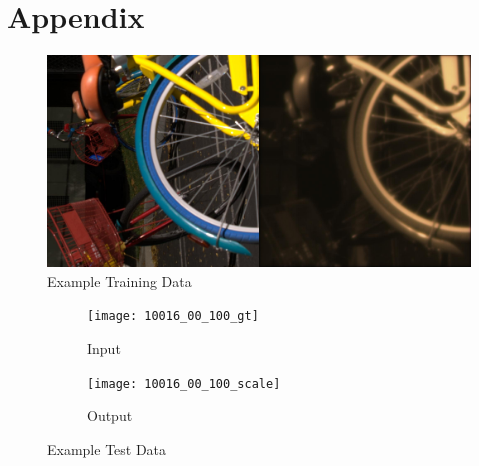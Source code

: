 \documentclass{article}
\begin{document}
\section{Appendix}

\begin{figure}[ht]
  \centering
  \includegraphics[scale=0.1]{00002_00_train_100}
  \caption{ Example Training Data}
  \label{fig:train}
\end{figure}

\begin{figure}[ht]
  \centering
  \begin{subfigure}[t]{0.3\textwidth}
    \texttt{[image: 10016\_00\_100\_gt]}
    \caption{Input}
  \end{subfigure}
  \begin{subfigure}[t]{0.3\textwidth}
    \texttt{[image: 10016\_00\_100\_scale]}
    \caption{Output}
  \end{subfigure}
  \caption{ Example Test Data}
  \label{fig:test}
\end{figure}




\end{document}
